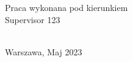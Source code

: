 {\begin{titlepage}
        \vfill

        \begin{flushright}
            \noindent
            {\textsf{Praca wykonana pod kierunkiem\\ Supervisor 123}} \\\
        \end{flushright}


        \begin{center}
            \vspace{7ex}
            {\normalsize \textsf{Warszawa, Maj 2023}}
         \end{center}
         
    \end{titlepage}%
}
\makeatother
